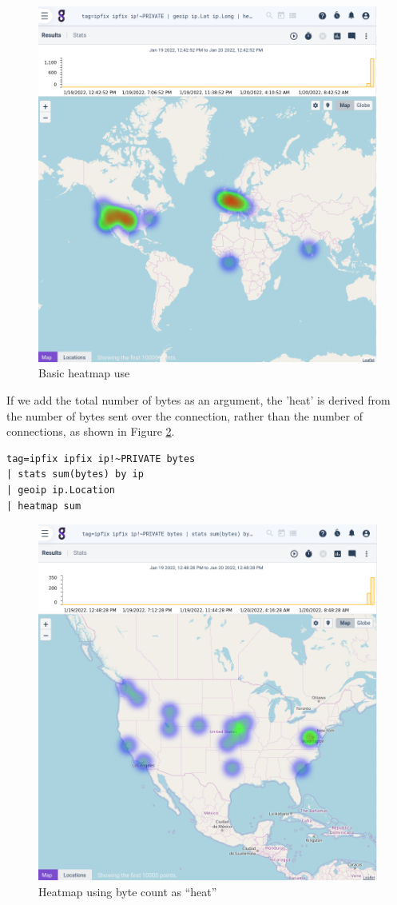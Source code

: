 \begin{figure}
	\includegraphics[width=0.6\linewidth]{images/heatmap-basic.png}
	\caption{Basic heatmap use}
	\label{fig:heatmap-basic}
\end{figure}

If we add the total number of bytes as an argument, the 'heat' is
derived from the number of bytes sent over the connection, rather than
the number of connections, as shown in Figure \ref{fig:heatmap-bytes}.

\begin{Verbatim}[breaklines=true]
tag=ipfix ipfix ip!~PRIVATE bytes 
| stats sum(bytes) by ip 
| geoip ip.Location 
| heatmap sum
\end{Verbatim}

\begin{figure}
	\includegraphics[width=0.6\linewidth]{images/heatmap-bytes.png}
	\caption{Heatmap using byte count as ``heat''}
	\label{fig:heatmap-bytes}
\end{figure}


